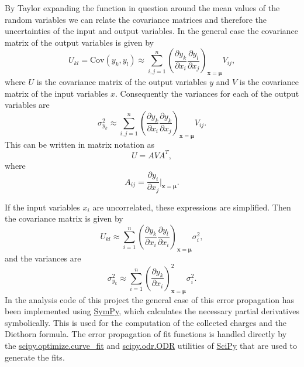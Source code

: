 \documentclass[a4paper]{article}
\begin{document}
By Taylor expanding the function in question around the mean values of the random variables we can relate the covariance matrices and therefore the uncertainties of the input and output variables.
In the general case the covariance matrix of the output variables is given by
\begin{equation}
U_{kl}
= \mathrm{Cov}(y_k, y_l)
\approx \sum_{i,j=1}^n \left( \frac{\partial y_k}{\partial x_i} \frac{\partial y_l}{\partial x_j} \right)_{\mathbf{x}=\mathbf{\mu}} V_{ij},
\end{equation}
where $U$ is the covariance matrix of the output variables $y$ and $V$ is the covariance matrix of the input variables $x$.
Consequently the variances for each of the output variables are
\begin{equation}
\sigma_{y_k}^2 \approx \sum_{i,j=1}^n \left( \frac{\partial y_k}{\partial x_i} \frac{\partial y_k}{\partial x_j} \right)_{\mathbf{x}=\mathbf{\mu}} V_{ij}.
\end{equation}
This can be written in matrix notation as
\begin{equation}
U = AVA^T,
\end{equation}
where
\begin{equation}
A_{ij} = \frac{\partial y_i}{\partial x_j} \vert_{\boldsymbol{x}=\boldsymbol{\mu}}.
\end{equation}
\cite[p. 20--22]{cowan_statistical_1998}

If the input variables $x_i$ are uncorrelated, these expressions are simplified.
Then the covariance matrix is given by
\begin{equation}
U_{kl} \approx \sum_{i=1}^n \left( \frac{\partial y_k}{\partial x_i} \frac{\partial y_l}{\partial x_i} \right)_{\mathbf{x}=\mathbf{\mu}} \sigma_i^2,
\end{equation}
and the variances are \cite[p. 20--22]{cowan_statistical_1998}
\begin{equation}
\sigma_{y_k}^2 \approx \sum_{i=1}^n \left( \frac{\partial y_k}{\partial x_i} \right)_{\mathbf{x}=\mathbf{\mu}}^2 \sigma_i^2.
\label{eq:variance}
\end{equation}
In the analysis code of this project the general case of this error propagation has been implemented using
\href{https://www.sympy.org/}{SymPy},
which calculates the necessary partial derivatives symbolically.
This is used for the computation of the collected charges and the Diethorn formula.
The error propagation of fit functions is handled directly by the
\href{https://docs.scipy.org/doc/scipy/reference/generated/scipy.optimize.curve_fit.html}{scipy.optimize.curve\_fit}
and
\href{https://docs.scipy.org/doc/scipy/reference/generated/scipy.odr.ODR.html}{scipy.odr.ODR} utilities of
\href{https://www.scipy.org/}{SciPy}
that are used to generate the fits.
\cite{repo}
\end{document}
